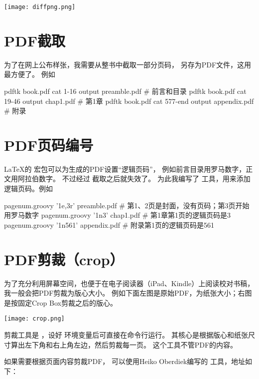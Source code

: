 \vspace{1ex}
\centerline{\texttt{[image: diffpng.png]}}

\section{PDF截取}
为了在网上公布样张，我需要从整书中截取一部分页码，
另存为PDF文件，这用  最方便了。
例如

\begin{Code}
pdftk book.pdf cat 1-16 output preamble.pdf     # 前言和目录
pdftk book.pdf cat 19-46 output chap1.pdf       # 第1章
pdftk book.pdf cat 577-end output appendix.pdf  # 附录
\end{Code}


\section{PDF页码编号}

\LaTeX 的  宏包可以为生成的PDF设置“逻辑页码”，
例如前言目录用罗马数字，正文用阿拉伯数字。
不过经过  截取之后就失效了。
为此我编写了  工具，用来添加逻辑页码。例如

\begin{Code}
pagenum.groovy '1e,3r' preamble.pdf  # 第1、2页是封面，没有页码；第3页开始用罗马数字
pagenum.groovy '1n3'   chap1.pdf     # 第1章第1页的逻辑页码是3
pagenum.groovy '1n561' appendix.pdf  # 附录第1页的逻辑页码是561
\end{Code}


\section{PDF剪裁（crop）}
\label{sec:pdfcrop}
为了充分利用屏幕空间，也便于在电子阅读器（iPad、Kindle）上阅读校对书稿，
我一般会把PDF剪裁为版心大小。
例如下面左图是原始PDF，为纸张大小；右图是按固定Crop Box剪裁之后的版心。

\vspace{1ex}
\centerline{\texttt{[image: crop.png]}}

剪裁工具是 ，设好  环境变量后可直接在命令行运行。
其核心是根据版心和纸张尺寸算出左下角和右上角左边，然后剪裁每一页。
这个工具不管PDF的内容。

如果需要根据页面内容剪裁PDF，
可以使用Heiko Oberdiek编写的  工具，地址如下：

